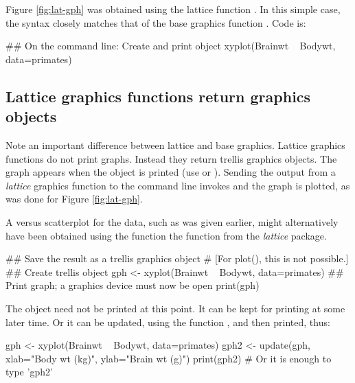 Figure \ref{fig:lat-gph} was obtained using the lattice function
. In this simple case, the syntax closely matches
that of the base graphics function . Code is:

\begin{Schunk}
\begin{Sinput}
## On the command line: Create and print object
xyplot(Brainwt ~ Bodywt, data=primates)
\end{Sinput}
\end{Schunk}

\subsection*{Lattice graphics functions return graphics objects}
Note an important difference between lattice and base graphics.
Lattice graphics functions do not print graphs. Instead they return
trellis graphics objects.  The graph appears when the object is
printed (use  or ).  Sending the output
from a {\em lattice} graphics function to the command line invokes
 and the graph is plotted, as was done for Figure
\ref{fig:lat-gph}.

A  versus  scatterplot for the
 data, such as was given earlier, might alternatively
have been obtained using the function the function 
from the \textit{lattice} package.

\begin{Schunk}
\begin{Sinput}
## Save the result as a trellis graphics object
# [For plot(), this is not possible.]
## Create trellis object
gph <- xyplot(Brainwt ~ Bodywt, data=primates)
## Print graph; a graphics device must now be open
print(gph)
\end{Sinput}
\end{Schunk}
The object  need not be printed at this point.  It can be
kept for printing at some later time.  Or it can be updated, using the
function , and then printed, thus:
\begin{Schunk}
\begin{Sinput}
gph <- xyplot(Brainwt ~ Bodywt, data=primates)
gph2 <- update(gph, xlab="Body wt (kg)",
               ylab="Brain wt (g)")
print(gph2)  # Or it is enough to type 'gph2'
\end{Sinput}
\end{Schunk}

